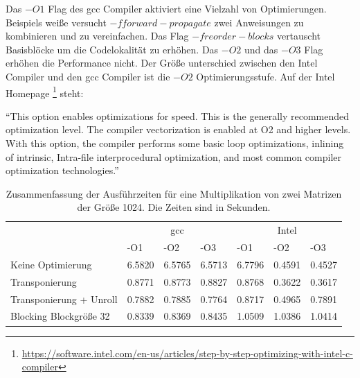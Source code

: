 Das $-O1$ Flag des gcc Compiler aktiviert eine Vielzahl von Optimierungen. Beispiels weiße versucht $-fforward-propagate$ zwei Anweisungen zu kombinieren und zu vereinfachen. Das Flag $-freorder-blocks$ vertauscht Basisblöcke um die Codelokalität zu erhöhen. Das $-O2$ und das $-O3$ Flag erhöhen die Performance nicht. 
Der Größe unterschied zwischen den Intel Compiler und den gcc Compiler ist die $-O2$ Optimierungsstufe. Auf der Intel Homepage \footnote{\url{https://software.intel.com/en-us/articles/step-by-step-optimizing-with-intel-c-compiler}} steht: 

``This option enables optimizations for speed. This is the generally recommended optimization level. The compiler vectorization is enabled at O2 and higher levels. With this option, the compiler performs some basic loop optimizations, inlining of intrinsic, Intra-file interprocedural optimization, and most common compiler optimization technologies.''

\begin{table}[h]
  \begin{tabular}{l|l|l|l|l|l|l}
  & \multicolumn{3}{c|}{gcc} &                                      \multicolumn{3}{|c}{Intel} \\

                          & -O1    & -O2    & -O3    &  -O1   & -O2    & -O3 \\
                            \hline
  Keine Optimierung       & 6.5820 & 6.5765 & 6.5713 & 6.7796 & 0.4591 & 0.4527\\
  Transponierung          & 0.8771 & 0.8773 & 0.8827 & 0.8768 & 0.3622 & 0.3617\\
  Transponierung + Unroll & 0.7882 & 0.7885 & 0.7764 & 0.8717 & 0.4965 & 0.7891\\
  Blocking Blockgröße 32  & 0.8339 & 0.8369 & 0.8435 & 1.0509 & 1.0386 & 1.0414\\


  \hline
 \end{tabular}
 \caption{Zusammenfassung der Ausführzeiten für eine Multiplikation von zwei Matrizen der Größe 1024. Die Zeiten sind in Sekunden.}
\end{table}

